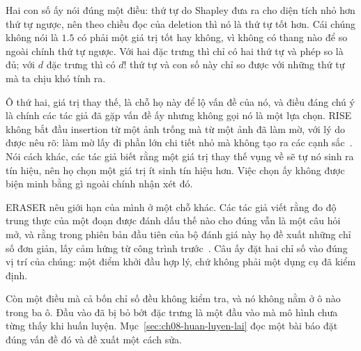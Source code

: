 Hai con số ấy nói đúng một điều: thứ tự do Shapley đưa ra cho diện tích nhỏ
hơn thứ tự ngược, nên theo chiều đọc của deletion thì nó là thứ tự tốt hơn. Cái
chúng không nói là $1.5$ có phải một giá trị tốt hay không, vì không có thang
nào để so ngoài chính thứ tự ngược. Với hai đặc trưng thì chỉ có hai thứ tự và
phép so là đủ; với $d$ đặc trưng thì có $d!$ thứ tự và con số này chỉ so được
với những thứ tự mà ta chịu khó tính ra.

Ô thứ hai, giá trị thay thế, là chỗ họ này để lộ vấn đề của nó, và điều đáng
chú ý là chính các tác giả đã gặp vấn đề ấy nhưng không gọi nó là một lựa
chọn. RISE
không bắt đầu insertion từ một ảnh trống mà từ một ảnh đã làm mờ, với lý do được
nêu rõ: làm mờ lấy đi phần lớn chi tiết nhỏ mà không tạo ra các cạnh
sắc~\autocite{mrise}. Nói cách khác, các tác giả biết rằng một giá trị thay thế
vụng về sẽ tự nó sinh ra tín hiệu, nên họ chọn một giá trị ít sinh tín hiệu hơn.
Việc chọn ấy không được biện minh bằng gì ngoài chính nhận xét đó.

ERASER nêu giới hạn của mình ở một chỗ khác. Các tác giả viết rằng đo độ trung
thực của một đoạn được đánh dấu thế nào cho đúng vẫn là một câu hỏi mở, và rằng
trong phiên bản đầu tiên của bộ đánh giá này họ đề xuất những chỉ số đơn giản,
lấy cảm hứng từ công trình trước~\autocite{meraser}. Câu ấy đặt hai chỉ số vào
đúng vị trí của chúng: một điểm khởi đầu hợp lý, chứ không phải một dụng cụ đã
kiểm định.

Còn một điều mà cả bốn chỉ số đều không kiểm tra, và nó không nằm ở ô nào trong
ba ô. Đầu vào đã bị bỏ bớt đặc trưng là một đầu vào mà mô hình chưa từng thấy
khi huấn luyện. Mục~\ref{sec:ch08-huan-luyen-lai} đọc một bài báo đặt đúng vấn
đề đó và đề xuất một cách sửa.
